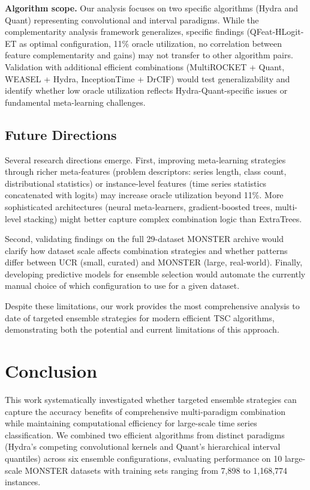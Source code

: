 \documentclass[pdflatex,sn-basic]{sn-jnl}           %
\theoremstyle{thmstyleone}%
\theoremstyle{thmstyletwo}%
\theoremstyle{thmstylethree}%
\begin{document}
\textbf{Algorithm scope.} Our analysis focuses on two specific algorithms (Hydra and Quant) representing convolutional and interval paradigms. While the complementarity analysis framework generalizes, specific findings (QFeat-HLogit-ET as optimal configuration, 11\% oracle utilization, no correlation between feature complementarity and gains) may not transfer to other algorithm pairs. Validation with additional efficient combinations (MultiROCKET + Quant, WEASEL + Hydra, InceptionTime + DrCIF) would test generalizability and identify whether low oracle utilization reflects Hydra-Quant-specific issues or fundamental meta-learning challenges.

\subsection{Future Directions}

Several research directions emerge. First, improving meta-learning strategies through richer meta-features (problem descriptors: series length, class count, distributional statistics) or instance-level features (time series statistics concatenated with logits) may increase oracle utilization beyond 11\%. More sophisticated architectures (neural meta-learners, gradient-boosted trees, multi-level stacking) might better capture complex combination logic than ExtraTrees.

Second, validating findings on the full 29-dataset MONSTER archive would clarify how dataset scale affects combination strategies and whether patterns differ between UCR (small, curated) and MONSTER (large, real-world). Finally, developing predictive models for ensemble selection would automate the currently manual choice of which configuration to use for a given dataset.

Despite these limitations, our work provides the most comprehensive analysis to date of targeted ensemble strategies for modern efficient TSC algorithms, demonstrating both the potential and current limitations of this approach.


\section{Conclusion}\label{sec13}

This work systematically investigated whether targeted ensemble strategies can capture the accuracy benefits of comprehensive multi-paradigm combination while maintaining computational efficiency for large-scale time series classification. We combined two efficient algorithms from distinct paradigms (Hydra's competing convolutional kernels and Quant's hierarchical interval quantiles) across six ensemble configurations, evaluating performance on 10 large-scale MONSTER datasets with training sets ranging from 7,898 to 1,168,774 instances.
\end{document}
